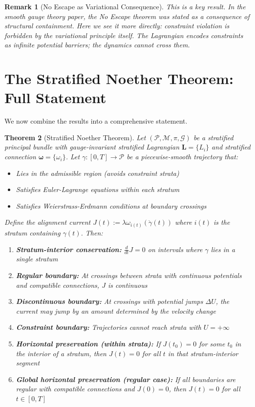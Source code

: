 \documentclass[11pt,a4paper]{article}
\newtheorem{theorem}{Theorem}[section]
\newtheorem{remark}[theorem]{Remark}
\begin{document}
\begin{remark}[No Escape as Variational Consequence]
This is a key result. In the smooth gauge theory paper, the No Escape theorem was stated as a consequence of structural containment. Here we see it more directly: \textit{constraint violation is forbidden by the variational principle itself}. The Lagrangian encodes constraints as infinite potential barriers; the dynamics cannot cross them.
\end{remark}

\section{The Stratified Noether Theorem: Full Statement}\label{sec:full-noether}

We now combine the results into a comprehensive statement.

\begin{theorem}[Stratified Noether Theorem]\label{thm:stratified-noether}
Let $(\mathcal{P}, \mathcal{M}, \pi, \mathcal{G})$ be a stratified principal bundle with gauge-invariant stratified Lagrangian $\mathbf{L} = \{L_i\}$ and stratified connection $\boldsymbol{\omega} = \{\omega_i\}$. Let $\gamma : [0, T] \to \mathcal{P}$ be a piecewise-smooth trajectory that:
\begin{itemize}
    \item Lies in the admissible region (avoids constraint strata)
    \item Satisfies Euler-Lagrange equations within each stratum
    \item Satisfies Weierstrass-Erdmann conditions at boundary crossings
\end{itemize}
Define the alignment current $J(t) := \lambda \omega_{i(t)}(\dot{\gamma}(t))$ where $i(t)$ is the stratum containing $\gamma(t)$. Then:
\begin{enumerate}
    \item[(a)] \textbf{Stratum-interior conservation:} $\frac{d}{dt} J = 0$ on intervals where $\gamma$ lies in a single stratum
    \item[(b)] \textbf{Regular boundary:} At crossings between strata with continuous potentials and compatible connections, $J$ is continuous
    \item[(c)] \textbf{Discontinuous boundary:} At crossings with potential jumps $\Delta U$, the current may jump by an amount determined by the velocity change
    \item[(d)] \textbf{Constraint boundary:} Trajectories cannot reach strata with $U = +\infty$
    \item[(e)] \textbf{Horizontal preservation (within strata):} If $J(t_0) = 0$ for some $t_0$ in the interior of a stratum, then $J(t) = 0$ for all $t$ in that stratum-interior segment
    \item[(f)] \textbf{Global horizontal preservation (regular case):} If all boundaries are regular with compatible connections and $J(0) = 0$, then $J(t) = 0$ for all $t \in [0, T]$
\end{enumerate}
\end{theorem}
\end{document}
